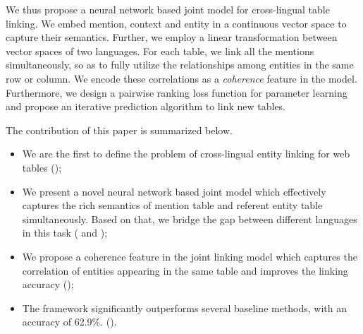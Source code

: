 
We thus propose a neural network based joint model for cross-lingual table linking. 
We embed mention, context and entity in a continuous vector space to 
capture their semantics.
Further, we employ a linear transformation between vector spaces of two languages. 
For each table, we link all the mentions simultaneously, 
so as to fully utilize the relationships among entities 
in the same row or column. We encode these correlations as a 
{\em coherence} feature in the model.
Furthermore, we design a pairwise ranking loss function for parameter 
learning and propose an iterative prediction algorithm to link new tables.


%

The contribution of this paper is summarized below.
\begin{itemize}
\itemsep0em
\item We are the first to define the problem of cross-lingual entity linking 
for web tables ();
\item We present a novel neural network based joint model which effectively captures the rich semantics of mention table and referent entity table simultaneously. Based on that, we bridge the gap between different languages in this task ( and );
\item We propose a coherence feature in the joint linking model which captures the correlation of entities appearing in the same table and improves the linking accuracy ();
\item The framework significantly outperforms
several baseline methods, with an accuracy of 62.9\%. ().
\end{itemize}
